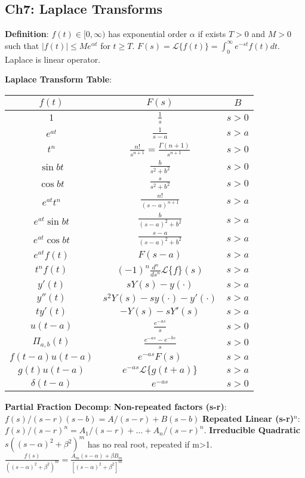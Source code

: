 \subsection*{Ch7: Laplace Transforms}

\textbf{Definition}: $f(t) \in [0, \infty)$ has exponential order $\alpha$ if exists $T>0$ and $M>0$ such that $|f(t)| \leq Me^{\alpha t}$ for $t \geq T$.
$F(s) = \mathcal{L}\{f(t)\} = \int_0^{\infty} e^{-st} f(t) dt$. 
Laplace is linear operator. 

\textbf{Laplace Transform Table}:\\
\begin{tabular}{|c|c|c|}
\hline
$f(t)$ & $F(s)$ & $B$\\
\hline
$1$ & $\frac{1}{s}$ & $s>0$ \\
$e^{at}$ & $\frac{1}{s-a}$ & $s>a$ \\
$t^n$ & $\frac{n!}{s^{n+1}}=\frac{\Gamma(n+1)}{s^{n+1}}$ & $s>0$ \\
$\sin{bt}$ & $\frac{b}{s^2 + b^2}$ & $s>0$\\
$\cos{bt}$ & $\frac{s}{s^2 + b^2}$ & $s>0$\\
$e^{at}t^n$ & $\frac{n!}{(s-a)^{n+1}}$ & $s>a$\\
$e^{at}\sin{bt}$ & $\frac{b}{(s-a)^2 + b^2}$ & $s>a$\\
$e^{at}\cos{bt}$ & $\frac{s-a}{(s-a)^2 + b^2}$ & $s>a$\\
$e^{at}f(t)$ & $F(s-a)$ & $s>a$\\
$t^nf(t)$ & $(-1)^n\frac{d^n}{ds^n}\mathcal{L}\{f\}(s)$ & $s>a$\\
$y'(t)$ & $sY(s) - y(\cdot)$ & $s>a$\\
$y''(t)$ & $s^2Y(s)-sy(\cdot) - y'(\cdot)$ & $s>a$\\
$ty'(t)$ & $-Y(s) - sY'(s)$ & $s>a$\\
\hline
$u(t-a)$ & $\frac{e^{-as}}{s}$ & $s>0$\\
$\Pi_{a,b}(t)$ & $\frac{e^{-as} - e^{-bs}}{s}$ & $s>0$\\
$f(t-a)u(t-a)$ & $e^{-as}F(s)$ & $s>a$\\
$g(t)u(t-a)$ & $e^{-as}\mathcal{L}\{g(t+a)\}$ & $s>a$\\
$\delta(t-a)$ & $e^{-as}$ & $s>0$\\
\hline
\end{tabular}

\textbf{Partial Fraction Decomp}: \textbf{Non-repeated factors (s-r)}: $f(s)/(s-r)(s-b) = A/(s-r) + B(s-b)$ 
\textbf{Repeated Linear (s-r)$^n$}: $f(s)/(s-r)^n = A_1/(s-r) + \dots + A_n/(s-r)^n$. 
\textbf{Irreducible Quadratic $s((s-\alpha)^2 + \beta^2)^m$} has no real root, repeated if m>1. 
$\frac{f(s)}{((s-\alpha)^2 + \beta^2)^m} = \frac{A_m(s-\alpha) + \beta B_m}{[(s-\alpha)^2 + \beta^2]^m}$

